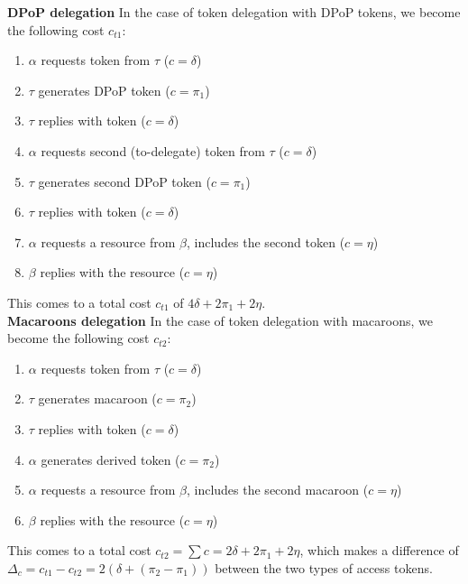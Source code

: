 \noindent\textbf{DPoP delegation} In the case of token delegation with \gls{DPoP} tokens, we become the following cost $c_{t1}$:
\begin{enumerate}
    \item $\alpha$ requests token from $\tau$ ($c = \delta$)
    \item $\tau$ generates \gls{DPoP} token ($c = \pi_1$)
    \item $\tau$ replies with token ($c = \delta$)
    \item $\alpha$ requests second (to-delegate) token from $\tau$ ($c = \delta$)
    \item $\tau$ generates second \gls{DPoP} token ($c = \pi_1$)
    \item $\tau$ replies with token ($c = \delta$)
    \item $\alpha$ requests a resource from $\beta$, includes the second token ($c = \eta$)
    \item $\beta$ replies with the resource ($c = \eta$)
\end{enumerate}
\noindent This comes to a total cost $c_{t1}$ of $4\delta + 2\pi_1 + 2\eta$.\\

\noindent\textbf{Macaroons delegation} In the case of token delegation with macaroons, we become the following cost $c_{t2}$:
\begin{enumerate}
    \item $\alpha$ requests token from $\tau$ ($c = \delta$)
    \item $\tau$ generates macaroon ($c = \pi_2$)
    \item $\tau$ replies with token ($c = \delta$)
    \item $\alpha$ generates derived token ($c = \pi_2$)
    \item $\alpha$ requests a resource from $\beta$, includes the second macaroon ($c = \eta$)
    \item $\beta$ replies with the resource ($c = \eta$)
\end{enumerate}
\noindent This comes to a total cost $c_{t2} = \sum c = 2\delta + 2\pi_1 + 2\eta$, which makes a difference of $\Delta_c = c_{t1} - c_{t2} = 2(\delta + (\pi_2 - \pi_1))$ between the two types of access tokens.

